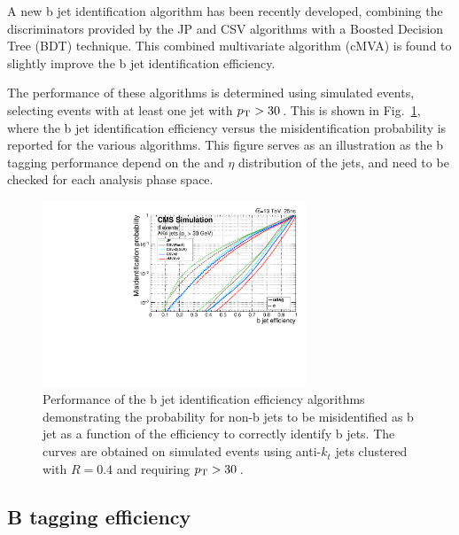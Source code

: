 A new b jet identification algorithm has been recently developed, combining the discriminators provided by the JP and CSV algorithms with a Boosted Decision Tree (BDT) technique. This combined multivariate algorithm (cMVA) is found to slightly improve the b jet identification efficiency.

The performance of these algorithms is determined using simulated \ttbar events, selecting events with at least one jet with $p_\mathrm{T} > 30$\,\GeV. This is shown in Fig.~\ref{fig:btagperf}, where the b jet identification efficiency versus the misidentification probability is reported for the various algorithms. This figure serves as an illustration as the b tagging performance depend on the \pt and $\eta$ distribution of the jets, and need to be checked for each analysis phase space.

\begin{figure}[htb]
\centering
\includegraphics[width=0.7\textwidth]{images/btagperf.pdf}
\caption{Performance of the b jet identification efficiency algorithms demonstrating the probability for non-b jets to be misidentified as b jet as a function of the efficiency to correctly identify b jets. The curves are obtained on simulated \ttbar events using anti-$k_t$ jets clustered with $R=0.4$ and requiring $p_\mathrm{T}>30$\,\GeV.}\label{fig:btagperf}
\end{figure}

\subsection{B tagging efficiency}


